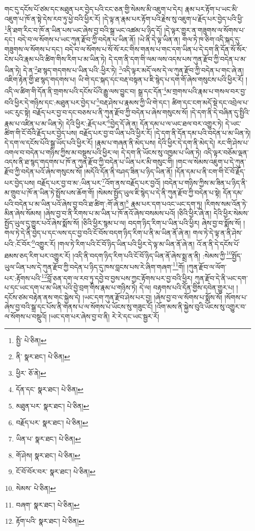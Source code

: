 གང་དུ་དངོས་པོ་ཙམ་དང་མཐུན་པར་བྱེད་པའི་ངང་ཅན་གྱི་སེམས་མི་འཇུག་པ་དེར། རྣམ་པར་རྟོག་པ་ཡང་མི་འཇུག་པ་ཁོ་ན་སྟེ་དེས་རབ་ཏུ་ཕྱེ་བའི་ཕྱིར་རོ། །དེ་ལྟ་ན་རྣམ་པར་རྟོག་པའི་རྗེས་སུ་འཇུག་པ་རྗོད་པར་བྱེད་པའི་ཕྱི་\footnote{སྤྱི་  པེ་ཅིན། }ནི་ཐག་རིང་བ་ཁོ་ན་ཡིན་པས་ཡང་ཞེས་བྱ་བའི་སྒྲ་ཡང་འཚམ་པ་ཉིད་དོ། །དེ་ལྟར་གྱུར་ན་གཟུགས་ལ་སོགས་པ་དང་། བདེ་བ་ལ་སོགས་པ་ཡང་ཀུན་རྫོབ་ཀྱི་བདེན་པ་ཡིན་ནོ། །ཡེ་ནི་དེ་ལྟ་ཡིན་ན། གལ་ཏེ་ཁ་ཅིག་འདི་སྐད་དུ་གཟུགས་ལ་སོགས་པ་དང་། བདེ་བ་ལ་སོགས་པ་སོ་སོ་རང་གིས་གནས་པ་གང་དག་ཡིན་པ་དེ་དག་ནི་དོན་སོ་སོར་ངེས་པའི་རྣམ་པའི་ཚིག་གིས་རིག་པ་མ་ཡིན་ཏེ། དེ་དག་ནི་དག་གི་ལམ་ལས་འདས་པས་ཀུན་རྫོབ་ཀྱི་བདེན་པ་མ་ཡིན་ཏེ། དེ་ན་\footnote{ནི་  སྣར་ཐང་།  པེ་ཅིན། }ཐ་སྙད་གདགས་པ་ཡིན་པའི་:ཕྱིར་ཏེ། \footnote{ཕྱིར་  ཅོ་ནེ། }འདི་ལྟར་མདོ་ལས་དེ་ལ་ཀུན་རྫོབ་ཀྱི་བདེན་པ་གང་ཞེ་ན། འཇིག་རྟེན་གྱི་ཐ་སྙད་གདགས་པ། ཡི་གེ་དང་སྐད་དང་བརྡ་བསྟན་པ་ཇི་སྙེད་པ་དག་གོ་ཞེས་གསུངས་པའི་ཕྱིར་རོ། །འདི་ལ་ཚིག་གི་དོན་ནི་གྲགས་པའི་དངོས་པོའི་རྒྱུ་ལས་བྱུང་བ། སྒྲ་དང་དོན་\footnote{དོན་དང་  སྣར་ཐང་།  པེ་ཅིན། }མ་གྲགས་པའི་རྣམ་པ་གསལ་བར་བྱ་བའི་ཕྱིར་དེ་གཉིས་དང་:མཐུན་པར་བྱེད་པ་\footnote{མཐུན་པར་  སྣར་ཐང་།  པེ་ཅིན། }བརྡ་ཤེས་པ་རྣམས་ཀྱི་ཡི་གེ་དང་། ཚིག་དང་ངག་མདོ་སྡེ་དང་འབྲེལ་པ་ཡང་རུང་སྟེ། བརྗོད་པར་བྱ་བ་དང་བཅས་པ་ནི་ཀུན་རྫོབ་ཀྱི་བདེན་པ་ཞེས་གསུངས་སོ། །དེ་དག་ནི་དེ་བཞིན་དུ་སྤྱིའི་རྣམ་པ་འཛིན་པ་མ་ཡིན་ཏེ། དེའི་ཕྱིར་:རྗོད་པར་\footnote{བརྗོད་པར་  སྣར་ཐང་།  པེ་ཅིན། }བྱེད་དོ་ཞེ་ན། དོན་དམ་པ་ལ་ཡང་ཐལ་བར་འགྱུར་ཏེ། དེ་ཡང་ཚིག་གི་ངོ་བོའི་རྗོད་པར་བྱེད་པས། བརྗོད་པར་བྱ་བ་ཡིན་པའི་ཕྱིར་རོ། །དེ་དག་ནི་དོན་དམ་པའི་བདེན་པ་མ་ཡིན་ཏེ། དེ་དག་ལ་དངོས་པོའི་སྒྲ་ཡོད་པའི་ཕྱིར་རོ། །རྣམ་པ་གཞན་ནི་མེད་པས། དེའི་ཕྱིར་དེ་དག་ནི་མེད་དེ། རང་གི་ཤེས་པ་འགལ་བ་བདེན་པ་གཉིས་ཀྱིས་མ་བསྡུས་པའི་ཕྱིར་ལ། དེ་དག་ནི་ཡོངས་སུ་འཁྱམ་པ་ཡིན་ཏེ། འདི་ལྟར་བཅོམ་ལྡན་འདས་ནི་ཐ་སྙད་གདགས་པ་ཁོ་ན་ཀུན་རྫོབ་ཀྱི་བདེན་པ་ཡིན་པར་མི་གསུང་གི། །གང་ལ་སེམས་འཇུག་པ་དེ་ཀུན་རྫོབ་ཀྱི་བདེན་པའོ་ཞེས་གསུངས་སོ། །མདོའི་དོན་ནི་བཤད་ཟིན་པ་ཉིད་ཡིན་ནོ། །དོན་དམ་པ་ནི་ངག་གི་ངོ་བོ་རྗོད་པར་བྱེད་པས། བརྗོད་པར་བྱ་བ་མ་:ཡིན་པར་\footnote{ཡིན་པ་  སྣར་ཐང་།  པེ་ཅིན། }འོག་ནས་བརྗོད་པར་བྱའོ། །བདེན་པ་གཉིས་ཀྱིས་མ་ཟིན་པ་ཉིད་ནི་མ་གྲུབ་པ་ཁོ་ན་ཡིན་ཏེ་སྤྲོས་པས་ཆོག་གོ། །སེམས་སྤྱོད་ཡུལ་ཇི་སྙེད་པ་དེ་ནི་ཀུན་རྫོབ་ཀྱི་བདེན་པ་སྟེ། དོན་དམ་པའི་བདེན་པ་མ་ཡིན་པའོ་ཞེས་བྱ་བའི་ཐ་ཚིག་:གོ་ཞེ་ན།\footnote{གོ་ཤེས།  སྣར་ཐང་།  པེ་ཅིན། } རྣམ་པར་དག་པའང་ཡང་དག་ཏུ། །རིགས་སམ་འོན་ཏེ་མིན་ཞེས་སོམས། །ཞེས་བྱ་བ་ནི་རིགས་པ་མ་ཡིན་པ་ཁོ་ནའོ་ཞེས་བསམས་པའོ། །ཅིའི་ཕྱིར་ཞེ་ན། དེའི་ཕྱིར་སེམས་སྤྱོད་ཡུལ་དུ་གྱུར་པའོ་ཞེས་སྨོས་སོ། །ཅིའི་ཕྱིར་སྙམ་པ་ལ། བདག་ཉིད་རིག་པ་ཡིན་པའི་ཕྱིར། ཞེས་བྱ་བ་སྨོས་སོ། །གལ་ཏེ་དེ་ནི་བྱེད་པ་དང་ལས་དང་བྱ་བའི་ངོ་བོས་བདག་ཉིད་རིག་པ་ནི་མ་ཡིན་ནོ་ཞེ་ན། གལ་ཏེ་དེ་ལྟ་ན་ནི་ཤེས་པའི་:ངོ་བོར་\footnote{ངོ་བོ་བོར་བར་  སྣར་ཐང་།  པེ་ཅིན། }འགྱུར་རོ། །གལ་ཏེ་རིག་པའི་ངོ་བོ་ཉིད་ཡིན་པའི་ཕྱིར་དེ་ལྟ་མ་ཡིན་ནོ་ཞེ་ན། འོ་ན་ནི་དེ་དངོས་པོ་ཐམས་ཅད་རིག་པར་འགྱུར་རོ། །འདི་ནི་བདག་ཉིད་རིག་པའི་ངོ་བོ་ཉིད་ཡིན་ནོ་ཞེས་སྨྲ་ན་ནི། :སེམས་ཀྱི་\footnote{སེམས་  པེ་ཅིན། }སྤྱོད་ཡུལ་ཡིན་པས་དེ་ཀུན་རྫོབ་ཀྱི་བདེན་པ་ཉིད་དུ་ཁས་བླངས་པས་རེ་ཞིག་གཞག་\footnote{བཞག་  སྣར་ཐང་།  པེ་ཅིན། }གོ། །ཀུན་རྫོབ་ལ་ལོག་པར་:རྟོགས་པའི་\footnote{རྟོག་པའི་  སྣར་ཐང་།  པེ་ཅིན། }བློ་ཅན་དག་ལ་རབ་ཏུ་དབྱེ་བ་བྱས་པས་ཀྱང་རྟོགས་པར་བྱ་བའི་ཕྱིར། ཀུན་རྫོབ་དེ་ནི་ཡང་དག་པ་དང་ཡང་དག་པ་མ་ཡིན་པའི་བྱེ་བྲག་གིས་རྣམ་པ་གཉིས་ཏེ། དེ་ལ། བརྟགས་པའི་དོན་གྱིས་དབེན་གྱུར་པ། །དངོས་ཙམ་བརྟེན་ནས་གང་སྐྱེས་དེ། །ཡང་དག་ཀུན་རྫོབ་ཤེས་པར་བྱ། །ཞེས་བྱ་བ་ལ་སོགས་པ་སྨོས་སོ། །སོགས་པ་ཞེས་བྱ་བའི་སྒྲ་དང་པོས་ནི་གནས་པ་ལ་སོགས་པ་ཡོངས་སུ་གཟུང་ངོ། །འོག་མས་ནི་སྐྱེས་བུའི་ཡོངས་སུ་འགྱུར་བ་ལ་སོགས་པ་བསྡུའོ། །ཡང་དག་པར་ཞེས་བྱ་བ་ནི། རེ་རེ་དང་ཡང་སྦྱར་རོ། 